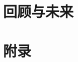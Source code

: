 \documentclass[11pt,twoside]{book} %
\begin{document}




\part{回顾与未来}


\appendix
\part{附录}










\end{document}
